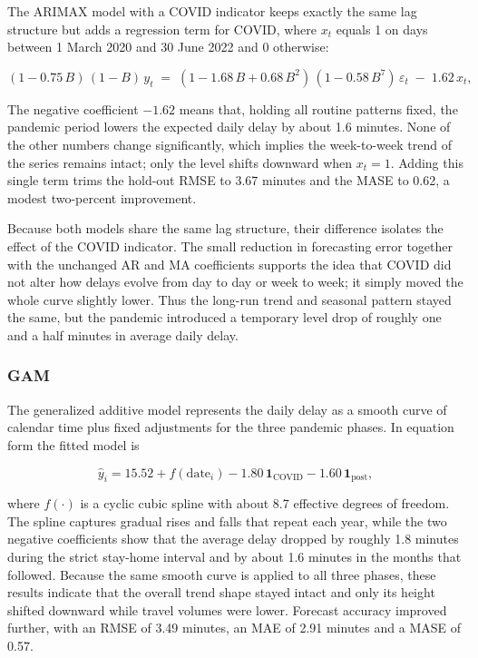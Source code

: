 \documentclass[
]{article}
\begin{document}
The ARIMAX model with a COVID indicator keeps exactly the same lag
structure but adds a regression term for COVID, where \(x_t\) equals 1
on days between 1 March 2020 and 30 June 2022 and 0 otherwise:

\[
(1 - 0.75\,B)\,(1-B)\,y_t
   \;=\;
   (1 - 1.68\,B + 0.68\,B^{2})\,
   (1 - 0.58\,B^{7})\,\varepsilon_t
   \;-\;1.62\,x_t ,
\]

The negative coefficient \(-1.62\) means that, holding all routine
patterns fixed, the pandemic period lowers the expected daily delay by
about 1.6 minutes. None of the other numbers change significantly, which
implies the week-to-week trend of the series remains intact; only the
level shifts downward when \(x_t=1\). Adding this single term trims the
hold-out RMSE to 3.67 minutes and the MASE to 0.62, a modest two-percent
improvement.

Because both models share the same lag structure, their difference
isolates the effect of the COVID indicator. The small reduction in
forecasting error together with the unchanged AR and MA coefficients
supports the idea that COVID did not alter how delays evolve from day to
day or week to week; it simply moved the whole curve slightly lower.
Thus the long-run trend and seasonal pattern stayed the same, but the
pandemic introduced a temporary level drop of roughly one and a half
minutes in average daily delay.

\subsubsection{GAM}\label{gam}

The generalized additive model represents the daily delay as a smooth
curve of calendar time plus fixed adjustments for the three pandemic
phases. In equation form the fitted model is

\[
\hat y_i = 15.52 + f(\text{date}_i) - 1.80\,\mathbf 1_{\text{COVID}} - 1.60\,\mathbf 1_{\text{post}} ,
\]

where \(f(\cdot)\) is a cyclic cubic spline with about 8.7 effective
degrees of freedom. The spline captures gradual rises and falls that
repeat each year, while the two negative coefficients show that the
average delay dropped by roughly 1.8 minutes during the strict stay-home
interval and by about 1.6 minutes in the months that followed. Because
the same smooth curve is applied to all three phases, these results
indicate that the overall trend shape stayed intact and only its height
shifted downward while travel volumes were lower. Forecast accuracy
improved further, with an RMSE of 3.49 minutes, an MAE of 2.91 minutes
and a MASE of 0.57.
\end{document}
